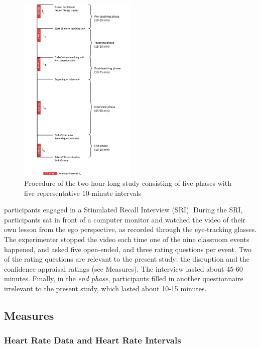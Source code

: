 \documentclass[preprint, 3p,
sort,]{elsarticle} %
\begin{document}
\begin{figure}
  \centering
  \includegraphics[width=0.5\textwidth]{images/Timeline_smaller.pdf}
  \caption{Procedure of the two-hour-long study consisting of five phases with five representative 10-minute intervals}
  \label{Procedure of the two-hour-long study consisting of five phases with five representative 10-minute intervals}
\end{figure}

\noindent participants engaged in a Stimulated Recall Interview (SRI).
During the SRI, participants sat in front of a computer monitor and
watched the video of their own lesson from the ego perspective, as
recorded through the eye-tracking glasses. The experimenter stopped the
video each time one of the nine classroom events happened, and asked
five open-ended, and three rating questions per event. Two of the rating
questions are relevant to the present study: the disruption and the
confidence appraisal ratings (see Measures). The interview lasted about
45-60 minutes. Finally, in the \emph{end phase}, participants filled in
another questionnaire irrelevant to the present study, which lasted
about 10-15 minutes.

\subsection{Measures}\label{measures}

\subsubsection{Heart Rate Data and Heart Rate
Intervals}\label{heart-rate-data-and-heart-rate-intervals}
\end{document}
